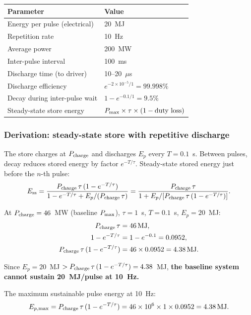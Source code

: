 \documentclass[11pt]{article}
\newcommand{\ee}[1]{\times 10^{#1}}
\newcommand{\Pmax}{P_{\rm max}}
\begin{document}
\begin{center}
\begin{tabular}{ll}
\toprule
Parameter & Value \\
\midrule
Energy per pulse (electrical) & 20~MJ \\
Repetition rate & 10~Hz \\
Average power & 200~MW \\
Inter-pulse interval & 100~ms \\
Discharge time (to driver) & 10--20~$\mu$s \\
Discharge efficiency & $e^{-2\ee{-5}/1} = 99.998\%$ \\
Decay during inter-pulse wait & $1 - e^{-0.1/1} = 9.5\%$ \\
Steady-state store energy & $P_{\rm max} \times \tau \times (1-\text{duty loss})$ \\
\bottomrule
\end{tabular}
\end{center}

\subsubsection{Derivation: steady-state store with repetitive discharge}

The store charges at $P_{\rm charge}$ and discharges $E_p$ every $T = 0.1$~s.
Between pulses, decay reduces stored energy by factor $e^{-T/\tau}$.
Steady-state stored energy just before the $n$-th pulse:
\begin{equation}
E_{\rm ss} = \frac{P_{\rm charge}\,\tau\,(1 - e^{-T/\tau})}{1 - e^{-T/\tau}
+ E_p/(P_{\rm charge}\,\tau)}
= \frac{P_{\rm charge}\,\tau}{1 + E_p/[P_{\rm charge}\,\tau\,(1-e^{-T/\tau})]}.
\end{equation}

At $P_{\rm charge} = 46$~MW (baseline $\Pmax$), $\tau = 1$~s, $T = 0.1$~s,
$E_p = 20$~MJ:
\begin{align}
P_{\rm charge}\,\tau &= 46\,\text{MJ}, \\
1 - e^{-T/\tau} &= 1 - e^{-0.1} = 0.0952, \\
P_{\rm charge}\,\tau\,(1-e^{-T/\tau}) &= 46 \times 0.0952 = 4.38\,\text{MJ}.
\end{align}

Since $E_p = 20$~MJ $> P_{\rm charge}\,\tau\,(1-e^{-T/\tau}) = 4.38$~MJ,
\textbf{the baseline system cannot sustain 20~MJ/pulse at 10~Hz.}

The maximum sustainable pulse energy at 10~Hz:
\begin{equation}
E_{p,\rm max} = P_{\rm charge}\,\tau\,(1 - e^{-T/\tau})
= 46\ee{6} \times 1 \times 0.0952 = 4.38\,\text{MJ}.
\end{equation}
\end{document}
